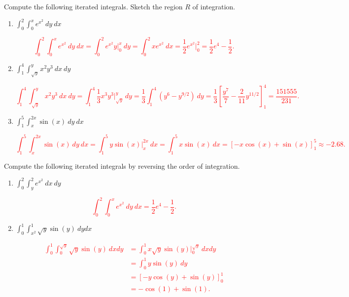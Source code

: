 \documentclass[12pt,reqno]{amsart}
\begin{document}
\bigskip
\prob Compute the following iterated integrals. Sketch the region $R$ of integration.

\begin{enumerate}
\item $\displaystyle\int_0^2 \int_0^x e^{x^2} \ dy\ dx$

\bigskip
\textcolor{red}{
	\[\int_0^2 \int_0^x e^{x^2} \ dy\ dx = \int_0^2 e^{x^2}y\big|_0^x \ dy = \int_0^2 x e^{x^2} \ dx = \frac{1}{2} e^{x^2}\big|_0^2 = \frac{1}{2} e^4 - \frac{1}{2}.
	\]}
\bigskip

\item $\displaystyle\int_1^4 \int_{\sqrt{y}}^y x^2 y^3 \ dx \ dy$

\bigskip
\textcolor{red}{
	\[\int_1^4 \int_{\sqrt{y}}^y x^2 y^3 \ dx \ dy = \int_1^4 \frac{1}{3} x^3 y^3\big|^y_{\sqrt{y}} \ dy = \frac{1}{3} \int_1^4 (y^6 - y^{9/2}) \ dy =\frac{1}{3} \left[ \frac{y^7}{7} - \frac{2}{11} y^{11/2} \right]_1^4 =\frac{151555}{231}.
	\]}
\bigskip

\item $\displaystyle\int_1^5 \int_x^{2x} \sin{(x)} \ dy \ dx$

\bigskip
\textcolor{red}{
	\[\int_1^5 \int_x^{2x} \sin{(x)} \ dy \ dx = \int_1^5 y \sin{(x)}\big|_x^{2x} \ dx = \int_1^5 x\sin{(x)} \ dx = [-x\cos{(x)} + \sin{(x)}]_1^5 \approx  -2.68.
	\]}
\bigskip
\end{enumerate}

\vfill
\newpage
\prob Compute the following iterated integrals by reversing the order of integration.

\begin{enumerate}
\item $\displaystyle\int_0^2 \int_y^2 e^{x^2} \ dx \ dy$

\bigskip
\textcolor{red}{
	\[\int_0^2 \int_0^x e^{x^2} \ dy \ dx = \frac{1}{2} e^4 - \frac{1}{2}.
	\]}
\bigskip

\item $\displaystyle\int_0^1\int_{x^2}^1 \sqrt{y} \sin{(y)} \ dy dx$

\bigskip
\textcolor{red}{
\begin{align*}
\int_0^1\int_{0}^{\sqrt{y}} \sqrt{y} \sin{(y)} \ dx dy &= \int_0^1 x\sqrt{y} \sin{(y)} \big|_{0}^{\sqrt{y}} \ dx dy \\
&= \int_0^1 y \sin{(y)} \ dy \\
&= [ -y \cos{(y)} + \sin{(y)}]_0^1 \\
&= -\cos{(1)} + \sin{(1)}.
\end{align*}}
\bigskip
\end{enumerate}
\end{document}
